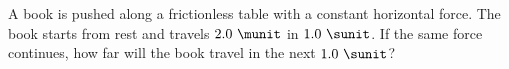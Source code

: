 A book is pushed along a frictionless table with a constant
horizontal force. The book starts from rest and travels $2.0\ \munit$
in $1.0\ \sunit$. If the same force continues, how far will the book
travel in the next $1.0\ \sunit$?\answercheck

